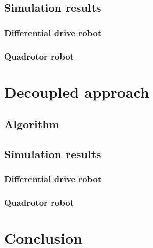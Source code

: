 \subsection{Simulation results}
\subsubsection{Differential drive robot}
\subsubsection{Quadrotor robot}

\section{Decoupled approach}
\subsection{Algorithm}
\subsection{Simulation results}
\subsubsection{Differential drive robot}
\subsubsection{Quadrotor robot}

\section{Conclusion}

\todomarker{}